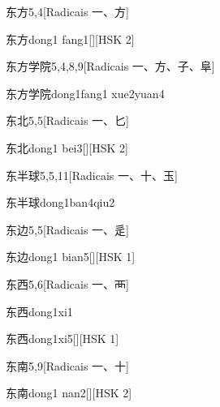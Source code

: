 \begin{entry}{东方}{5,4}[Radicais ⼀、⽅]
  \begin{phonetics}{东方}{dong1 fang1}[][HSK 2]
  \end{phonetics}
\end{entry}

\begin{entry}{东方学院}{5,4,8,9}[Radicais ⼀、⽅、⼦、⾩]
  \begin{phonetics}{东方学院}{dong1fang1 xue2yuan4}
  \end{phonetics}
\end{entry}

\begin{entry}{东北}{5,5}[Radicais ⼀、⼔]
  \begin{phonetics}{东北}{dong1 bei3}[][HSK 2]
  \end{phonetics}
\end{entry}

\begin{entry}{东半球}{5,5,11}[Radicais ⼀、⼗、⽟]
  \begin{phonetics}{东半球}{dong1ban4qiu2}
  \end{phonetics}
\end{entry}

\begin{entry}{东边}{5,5}[Radicais ⼀、⾡]
  \begin{phonetics}{东边}{dong1 bian5}[][HSK 1]
  \end{phonetics}
\end{entry}

\begin{entry}{东西}{5,6}[Radicais ⼀、⾑]
  \begin{phonetics}{东西}{dong1xi1}
  \end{phonetics}
  \begin{phonetics}{东西}{dong1xi5}[][HSK 1]
  \end{phonetics}
\end{entry}

\begin{entry}{东南}{5,9}[Radicais ⼀、⼗]
  \begin{phonetics}{东南}{dong1 nan2}[][HSK 2]
  \end{phonetics}
\end{entry}

